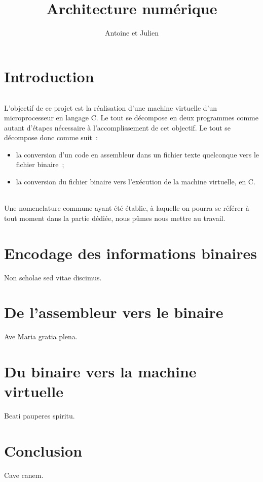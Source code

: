 \documentclass[11pt]{article}
\begin{document}
	\title{Architecture numérique}
	\author{Antoine  et Julien }
	\maketitle

	\part*{Introduction}
	\paragraph{}
	L'objectif de ce projet est la réalisation d'une machine virtuelle d'un microprocesseur en langage C. Le tout se décompose en deux programmes comme autant d'étapes nécessaire à l'accomplissement de cet objectif. Le tout se décompose donc comme suit~:

	\begin{itemize}
		\item la conversion d'un code en assembleur dans un fichier texte quelconque vers le fichier binaire~;
		\item la conversion du fichier binaire vers l'exécution de la machine virtuelle, en C.
	\end{itemize}

	\paragraph{}
	Une nomenclature commune ayant été établie, à laquelle on pourra se référer à tout moment dans la partie dédiée, nous pûmes nous mettre au travail.

	\part*{Encodage des informations binaires}
	Non scholae sed vitae discimus.

	\part*{De l'assembleur vers le binaire}
	Ave Maria gratia plena.

	\part*{Du binaire vers la machine virtuelle}
	Beati pauperes spiritu.

	\part*{Conclusion}
	Cave canem.
\end{document}
